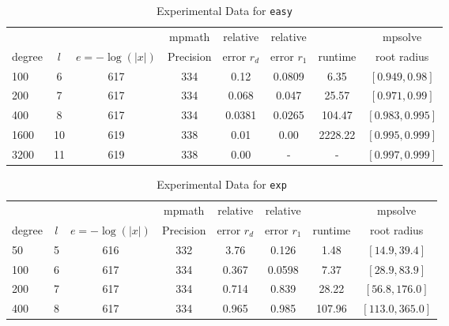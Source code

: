 \documentclass[sigconf]{acmart}
\begin{document}
\begin{table}[t]
\caption{Experimental Data for \texttt{easy}} %
\label{tab:easy}
\vskip -0.15in
\begin{center}
\begin{small}
\begin{sc}
\begin{tabular}{lccccccc}
\toprule
&  &  & mpmath & relative  & relative &  & mpsolve \\
degree  & $l$& $e=-\log(|x|)$& Precision &error $r_d$       & error $r_1$ &runtime& root radius\\
\midrule
 100 & 6 & 617 & 334 & 0.12 & 0.0809 & 6.35 & $[0.949, 0.98]$\\
 200 & 7 & 617 & 334 & 0.068 & 0.047 & 25.57 & $[0.971, 0.99]$\\
 400 & 8 & 617 & 334 & 0.0381 & 0.0265 & 104.47 & $[0.983, 0.995]$\\
 1600 &10& 619 & 338 & 0.01 & 0.00 & 2228.22 & $[0.995, 0.999]$\\ %
  3200 &11& 619 & 338 & 0.00 & - & - & $[0.997, 0.999]$\\ %
\bottomrule
\end{tabular}
\end{sc}
\end{small}
\end{center}
\vskip 0.05in
\end{table}


\begin{table}[t]
\caption{Experimental Data for \texttt{exp}} %
\label{tab:exp}
\vskip -0.15in
\begin{center}
\begin{small}
\begin{sc}
\begin{tabular}{lccccccc}
\toprule
&  &  & mpmath & relative  & relative &  & mpsolve \\
degree  & $l$& $e=-\log(|x|)$& Precision &error $r_d$       & error $r_1$ &runtime& root radius\\
\midrule
 50 & 5 & 616 & 332 & 3.76 & 0.126 & 1.48 & $[14.9, 39.4]$\\
100 & 6 & 617 & 334 & 0.367 & 0.0598 & 7.37 & $[28.9, 83.9]$\\
 200 & 7 & 617 & 334 & 0.714 & 0.839 & 28.22 & $[56.8, 176.0]$\\
 400 & 8 & 617 & 334 & 0.965 & 0.985 & 107.96 & $[113.0, 365.0]$\\
\bottomrule
\end{tabular}
\end{sc}
\end{small}
\end{center}
\vskip 0.05in
\end{table}
\end{document}
